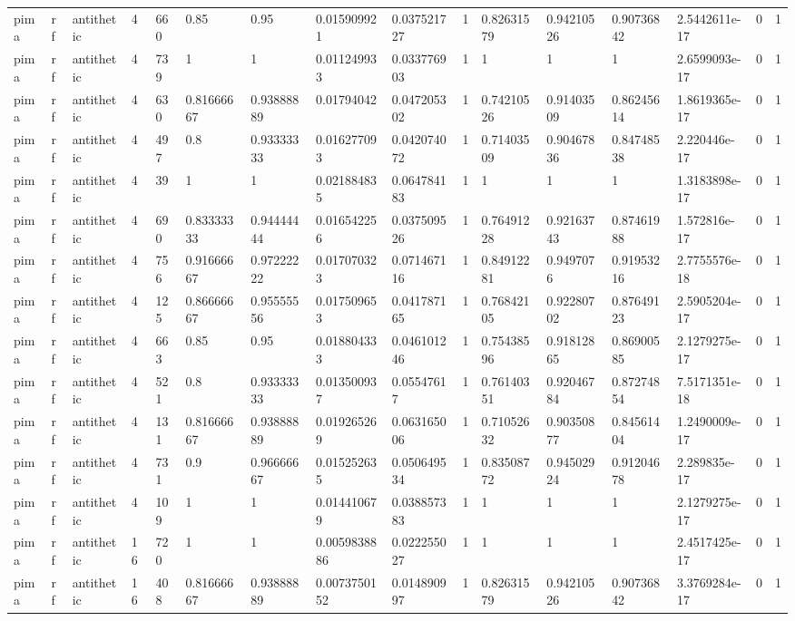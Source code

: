 \begin{tabular}{llllllllllllllll}
pima & rf & antithetic & 4 & 660 & 0.85 & 0.95 & 0.015909921 & 0.037521727 & 1 & 0.82631579 & 0.94210526 & 0.90736842 & 2.5442611e-17 & 0 & 1 \\
pima & rf & antithetic & 4 & 739 & 1 & 1 & 0.011249933 & 0.033776903 & 1 & 1 & 1 & 1 & 2.6599093e-17 & 0 & 1 \\
pima & rf & antithetic & 4 & 630 & 0.81666667 & 0.93888889 & 0.01794042 & 0.047205302 & 1 & 0.74210526 & 0.91403509 & 0.86245614 & 1.8619365e-17 & 0 & 1 \\
pima & rf & antithetic & 4 & 497 & 0.8 & 0.93333333 & 0.016277093 & 0.042074072 & 1 & 0.71403509 & 0.90467836 & 0.84748538 & 2.220446e-17 & 0 & 1 \\
pima & rf & antithetic & 4 & 39 & 1 & 1 & 0.021884835 & 0.064784183 & 1 & 1 & 1 & 1 & 1.3183898e-17 & 0 & 1 \\
pima & rf & antithetic & 4 & 690 & 0.83333333 & 0.94444444 & 0.016542256 & 0.037509526 & 1 & 0.76491228 & 0.92163743 & 0.87461988 & 1.572816e-17 & 0 & 1 \\
pima & rf & antithetic & 4 & 756 & 0.91666667 & 0.97222222 & 0.017070323 & 0.071467116 & 1 & 0.84912281 & 0.9497076 & 0.91953216 & 2.7755576e-18 & 0 & 1 \\
pima & rf & antithetic & 4 & 125 & 0.86666667 & 0.95555556 & 0.017509653 & 0.041787165 & 1 & 0.76842105 & 0.92280702 & 0.87649123 & 2.5905204e-17 & 0 & 1 \\
pima & rf & antithetic & 4 & 663 & 0.85 & 0.95 & 0.018804333 & 0.046101246 & 1 & 0.75438596 & 0.91812865 & 0.86900585 & 2.1279275e-17 & 0 & 1 \\
pima & rf & antithetic & 4 & 521 & 0.8 & 0.93333333 & 0.013500937 & 0.05547617 & 1 & 0.76140351 & 0.92046784 & 0.87274854 & 7.5171351e-18 & 0 & 1 \\
pima & rf & antithetic & 4 & 131 & 0.81666667 & 0.93888889 & 0.019265269 & 0.063165006 & 1 & 0.71052632 & 0.90350877 & 0.84561404 & 1.2490009e-17 & 0 & 1 \\
pima & rf & antithetic & 4 & 731 & 0.9 & 0.96666667 & 0.015252635 & 0.050649534 & 1 & 0.83508772 & 0.94502924 & 0.91204678 & 2.289835e-17 & 0 & 1 \\
pima & rf & antithetic & 4 & 109 & 1 & 1 & 0.014410679 & 0.038857383 & 1 & 1 & 1 & 1 & 2.1279275e-17 & 0 & 1 \\
pima & rf & antithetic & 16 & 720 & 1 & 1 & 0.0059838886 & 0.022255027 & 1 & 1 & 1 & 1 & 2.4517425e-17 & 0 & 1 \\
pima & rf & antithetic & 16 & 408 & 0.81666667 & 0.93888889 & 0.0073750152 & 0.014890997 & 1 & 0.82631579 & 0.94210526 & 0.90736842 & 3.3769284e-17 & 0 & 1 \\

\end{tabular}
